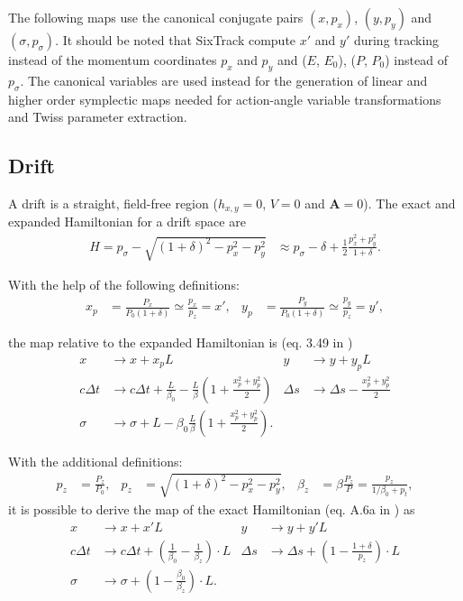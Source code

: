 \documentclass[english]{article}
\begin{document}
The following maps use the canonical conjugate pairs $(x,p_x)$, $(y,p_y)$ 
and $(\sigma,p_\sigma)$. It should be noted that SixTrack compute $x'$ and $y'$
during tracking instead of the momentum coordinates $p_x$ and $p_y$ and ($E$,
$E_0$), ($P$, $P_0$) instead of $p_\sigma$. The canonical variables are
used instead for the generation of linear and higher order symplectic maps
needed for action-angle variable transformations and Twiss parameter extraction.


\subsection{Drift}
A drift is a straight, field-free region ($h_{x,y}=0$, $V=0$ and
$\mathbf{A}=0$).  The exact and expanded Hamiltonian for a drift space are
\begin{align}
  H = p_\sigma - \sqrt{(1+\delta)^2 - p_x^2 - p_y^2} &\approx
  p_\sigma - \delta + \frac{1}{2}\frac{p_x^2+p_y^2}{1+\delta}.
\end{align}

With the help of the following definitions:
\begin{align}
   x_p&=\frac{P_x}{P_0 (1+\delta)}\simeq\frac{p_x}{p_z}=x', &
   y_p&=\frac{P_y}{P_0 (1+\delta)}\simeq\frac{p_y}{p_z}=y', %
\end{align}


the map relative to the expanded Hamiltonian is (eq. 3.49 in \cite{ripken95})
\begin{align}
  x & \to x + x_p L &
  y & \to y + y_p L\\
  c\Delta t & \to c\Delta t + \frac{L}{\beta_0} - \frac{L}{\beta} 
  \left(1+\frac{x_p^2+y_p^2}{2}  \right) &
  \Delta s & \to \Delta s -\frac{x_p^2+y_p^2}{2} \\
  \sigma & \to \sigma +
  L - \beta_0 \frac{L}\beta
        \left( 1+\frac{x_p^2+y_p^2}{2}  \right)  .
\end{align}

\noindent With the additional definitions:
\begin{align}
  p_z&=\frac{P_z}{P_0}, &
  p_z&=\sqrt{(1+\delta)^2 - p_x^2 - p_y^2}, &
  \beta_z &= \beta \frac{P_z}{P}= \frac{p_z}{1/\beta_0+p_t},
\end{align}
it is possible to derive the 
map of the exact Hamiltonian (eq. A.6a in \cite{heinemann95}) as
\begin{align}
  x      & \to x+x'L &
  y      & \to y+y'L \\
    c\Delta t     & \to c\Delta t + \left(\frac{1}{\beta_0}
  -\frac{1}{\beta_z}\right)\cdot L &
    \Delta s  & \to \Delta s+\left(1-\frac{1+\delta}{p_z}\right)\cdot L \\
  \sigma & \to \sigma + \left(1 - \frac{\beta_0}{\beta_z} \right) \cdot L.
\end{align}
\end{document}
